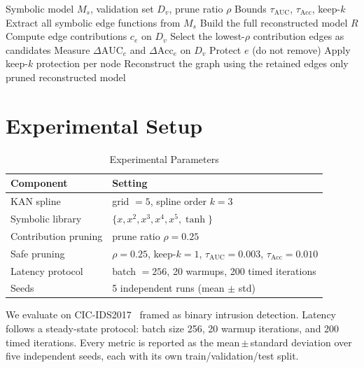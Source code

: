 \documentclass[conference]{IEEEtran}
\begin{document}
\begin{algorithm}[t]
\caption{Safe Pruning Followed by Reconstruction}
\label{alg:safe}
\begin{algorithmic}[1]
\Require Symbolic model $M_s$, validation set $D_v$, prune ratio $\rho$
\Require Bounds $\tau_{\mathrm{AUC}}$, $\tau_{\mathrm{Acc}}$, keep-$k$
\State Extract all symbolic edge functions from $M_s$
\State Build the full reconstructed model $R$
\State Compute edge contributions $c_e$ on $D_v$
\State Select the lowest-$\rho$ contribution edges as candidates
    \State Measure $\Delta \mathrm{AUC}_e$ and $\Delta \mathrm{Acc}_e$ on $D_v$
        \State Protect $e$ (do not remove)
    \EndIf
\EndFor
\State Apply keep-$k$ protection per node
\State Reconstruct the graph using the retained edges only
\State \Return pruned reconstructed model
\end{algorithmic}
\end{algorithm}

\section{Experimental Setup}

\begin{table}[t]
\caption{Experimental Parameters}
\label{tab:params}
\centering
\footnotesize
\begin{tabular}{p{}p{}}
\toprule
Component & Setting\\
\midrule
KAN spline & grid $=5$, spline order $k=3$\\
Symbolic library & $\{x,x^2,x^3,x^4,x^5,\tanh\}$\\
Contribution pruning & prune ratio $\rho = 0.25$\\
Safe pruning & $\rho = 0.25$, keep-$k = 1$,
$\tau_{\mathrm{AUC}} = 0.003$, $\tau_{\mathrm{Acc}} = 0.010$\\
Latency protocol & batch $= 256$, 20 warmups, 200 timed iterations\\
Seeds & 5 independent runs (mean $\pm$ std)\\
\bottomrule
\end{tabular}
\end{table}

We evaluate on CIC-IDS2017~\cite{cicids} framed as binary intrusion detection.
Latency follows a steady-state protocol: batch size 256, 20 warmup iterations,
and 200 timed iterations. Every metric is reported as the mean\,$\pm$\,standard
deviation over five independent seeds, each with its own train/validation/test
split.
\end{document}
